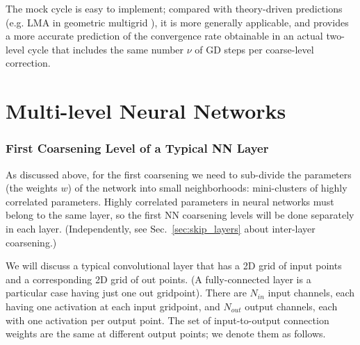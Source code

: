 \documentclass{article} %
\begin{document}
The mock cycle is easy to implement; compared with theory-driven predictions (e.g. LMA in geometric multigrid \cite[Sec.~2.1]{guide}), it is more generally applicable, and provides a more accurate prediction of the convergence rate obtainable in an actual two-level cycle that includes the same number $\nu$ of GD steps per coarse-level correction.


\newpage
\part{Multi-level Neural Networks}
\label{sec:nn}

\section{First Coarsening Level of a Typical NN Layer}
\label{sec:nn_coarse1}

As discussed above, for the first coarsening we need to sub-divide the parameters (the weights $w$) of the network into small neighborhoods: mini-clusters of highly correlated parameters. Highly correlated parameters in neural networks must belong to the same layer, so the first NN coarsening levels will be done separately in each layer. (Independently, see Sec.~\ref{sec:skip_layers} about inter-layer coarsening.)

We will discuss a typical convolutional layer that has a 2D grid of input points and a corresponding 2D grid of out points. (A fully-connected layer is a particular case having just one out gridpoint). There are $N_{in}$ input channels, each having one activation at each input gridpoint, and $N_{out}$ output channels, each with one activation per output point. The set of input-to-output connection weights are the same at different output points; we denote them as follows.
\end{document}
